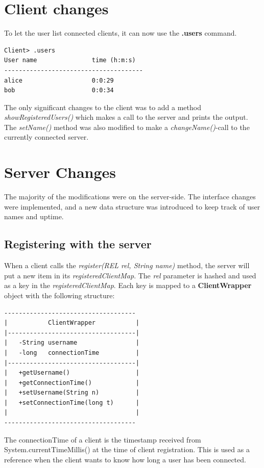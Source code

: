 \documentclass[conference, a4paper]{IEEEtran}
\begin{document}
\section{Client changes}
To let the user list connected clients, it can now use the \textbf{.users} command.

\begin{verbatim}
Client> .users
User name               time (h:m:s)
--------------------------------------
alice                   0:0:29
bob                     0:0:34
\end{verbatim}
The only significant changes to the client was to add a method \textit{showRegisteredUsers()} which makes a call to the server and prints the output. The \textit{setName()} method was also modified to make a \textit{changeName()}-call to the currently connected server.

\section{Server Changes}
The majority of the modifications were on the server-side. The interface changes were implemented, and a new data structure was introduced to keep track of user names and uptime.

\subsection{Registering with the server}
When a client calls the \textit{register(REL rel, String name)} method, the server will put a new item in its \textit{registeredClientMap}. The \textit{rel} parameter is hashed and used as a key in the \textit{registeredClientMap}. Each key is mapped to a \textbf{ClientWrapper} object with the following structure:
\begin{verbatim}
------------------------------------
|           ClientWrapper           |
|-----------------------------------|
|   -String username                |
|   -long   connectionTime          |
|-----------------------------------|
|   +getUsername()                  |
|   +getConnectionTime()            |
|   +setUsername(String n)          |
|   +setConnectionTime(long t)      |
|                                   |
------------------------------------
\end{verbatim}
The connectionTime of a client is the timestamp received from System.currentTimeMillis() at the time of client registration. This is used as a reference when the client wants to know how long a user has been connected.
\end{document}
